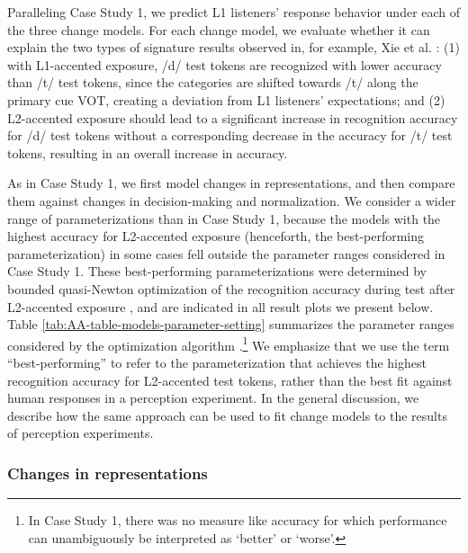\documentclass[
  11pt,
  man,floatsintext]{apa6}
\begin{document}
Paralleling Case Study 1, we predict L1 listeners' response behavior under each of the three change models. For each change model, we evaluate whether it can explain the two types of signature results observed in, for example, Xie et al. \autocite*{xie2016jep}: (1) with L1-accented exposure, /d/ test tokens are recognized with lower accuracy than /t/ test tokens, since the categories are shifted towards /t/ along the primary cue VOT, creating a deviation from L1 listeners' expectations; and (2) L2-accented exposure should lead to a significant increase in recognition accuracy for /d/ test tokens without a corresponding decrease in the accuracy for /t/ test tokens, resulting in an overall increase in accuracy.

As in Case Study 1, we first model changes in representations, and then compare them against changes in decision-making and normalization. We consider a wider range of parameterizations than in Case Study 1, because the models with the highest accuracy for L2-accented exposure (henceforth, the best-performing parameterization) in some cases fell outside the parameter ranges considered in Case Study 1. These best-performing parameterizations were determined by bounded quasi-Newton optimization of the recognition accuracy during test after L2-accented exposure \autocite[implemented in function \texttt{optim()} in R]{byrd1995}, and are indicated in all result plots we present below. Table \ref{tab:AA-table-models-parameter-setting} summarizes the parameter ranges considered by the optimization algorithm \autocite[\(\nu_{c,0}\) must be larger than the number of cues \(k\) + 1,][p.~134]{murphy2012}.\footnote{In Case Study 1, there was no measure like accuracy for which performance can unambiguously be interpreted as `better' or `worse'.} We emphasize that we use the term ``best-performing'' to refer to the parameterization that achieves the highest recognition accuracy for L2-accented test tokens, rather than the best fit against human responses in a perception experiment. In the general discussion, we describe how the same approach can be used to fit change models to the results of perception experiments.

\hypertarget{changes-in-representations-1}{%
\subsubsection{Changes in representations}\label{changes-in-representations-1}}
\end{document}
